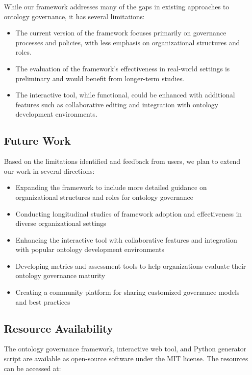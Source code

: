 \documentclass[conference]{IEEEtran}
\begin{document}
While our framework addresses many of the gaps in existing approaches to ontology governance, it has several limitations:

\begin{itemize}
    \item The current version of the framework focuses primarily on governance processes and policies, with less emphasis on organizational structures and roles.
    \item The evaluation of the framework's effectiveness in real-world settings is preliminary and would benefit from longer-term studies.
    \item The interactive tool, while functional, could be enhanced with additional features such as collaborative editing and integration with ontology development environments.
\end{itemize}

\subsection{Future Work}

Based on the limitations identified and feedback from users, we plan to extend our work in several directions:

\begin{itemize}
    \item Expanding the framework to include more detailed guidance on organizational structures and roles for ontology governance
    \item Conducting longitudinal studies of framework adoption and effectiveness in diverse organizational settings
    \item Enhancing the interactive tool with collaborative features and integration with popular ontology development environments
    \item Developing metrics and assessment tools to help organizations evaluate their ontology governance maturity
    \item Creating a community platform for sharing customized governance models and best practices
\end{itemize}

\subsection{Resource Availability}

The ontology governance framework, interactive web tool, and Python generator script are available as open-source software under the MIT license. The resources can be accessed at:
\end{document}
